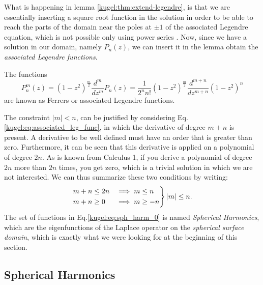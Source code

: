 What is happening in lemma \ref{kugel:thm:extend-legendre}, is that we are
essentially inserting a square root function in the solution in order to be able
to reach the parts of the domain near the poles at $\pm 1$ of the associated
Legendre equation, which is not possible only using power series
. Now, since
we have a solution in our domain, namely $P_n(z)$, we can insert it in the lemma 
obtain the \emph{associated Legendre functions}.

\begin{definition}
  \label{kugel:def:ferrers-functions}
  The functions
  \begin{equation}
    P^m_n (z) = (1-z^2)^{\frac{m}{2}}\frac{d^{m}}{dz^{m}} P_n(z)
      = \frac{1}{2^n n!}(1-z^2)^{\frac{m}{2}}\frac{d^{m+n}}{dz^{m+n}}(1-z^2)^n 
  \end{equation}
  are known as Ferrers or associated Legendre functions.
\end{definition}


The constraint $|m|<n$, can be justified by considering Eq.\eqref{kugel:eq:associated_leg_func}, in which the derivative of degree $m+n$ is present. A derivative to be well defined must have an order that is greater than zero. Furthermore, it can be seen that this derivative is applied on a polynomial of degree $2n$. As is known from Calculus 1, if you derive a polynomial of degree $2n$ more than $2n$ times, you get zero, which is a trivial solution in which we are not interested.\newline
We can thus summarize these two conditions by writing:
\begin{equation*}
    \begin{rcases}
        m+n \leq 2n &\implies m \leq n \\
        m+n \geq 0  &\implies  m \geq -n
    \end{rcases} |m| \leq n.
\end{equation*}
The set of functions in Eq.\eqref{kugel:eq:sph_harm_0} is named \emph{Spherical Harmonics}, which are the eigenfunctions of the Laplace operator on the \emph{spherical surface domain}, which is exactly what we were looking for at the beginning of this section.
\fi

\subsection{Spherical Harmonics}

